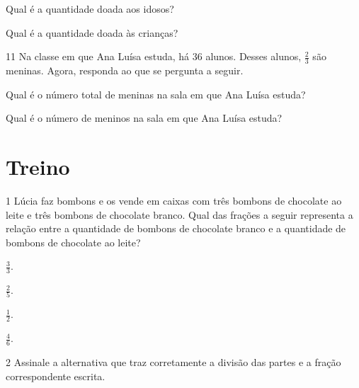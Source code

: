 \begin{escolha}
\item
  Qual é a quantidade doada aos idosos?

\item
  Qual é a quantidade doada às crianças?
\end{escolha}


\num{11} Na classe em que Ana Luísa estuda, há 36 alunos. Desses alunos, $\frac{2}{3}$
são meninas. Agora, responda ao que se pergunta a seguir.

\begin{escolha}
\item
  Qual é o número total de meninas na sala em que Ana Luísa estuda?

\item
  Qual é o número de meninos na sala em que Ana Luísa estuda?
\end{escolha}


\pagebreak
\section*{Treino}

\num{1} Lúcia faz bombons e os vende em caixas com três bombons de chocolate ao leite e três bombons de chocolate branco. Qual das frações a seguir representa a relação entre a quantidade de
bombons de chocolate branco e a quantidade de bombons de chocolate ao leite?

\begin{multicols}{2}
\begin{escolha}
\item
  $\frac{3}{3}$.

\item
  $\frac{2}{5}$.

\item
  $\frac{1}{2}$.

\item
  $\frac{4}{6}$.
\end{escolha}
\end{multicols}

\num{2} Assinale a alternativa que traz corretamente a divisão das partes e a
fração correspondente escrita.

